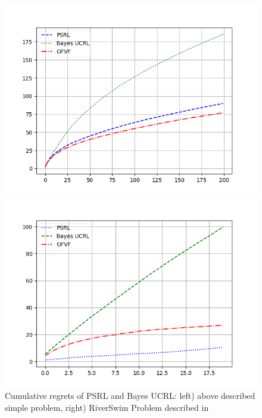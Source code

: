 \documentclass[a4paper,man,natbib]{apa6}
\begin{document}
\begin{figure}
	\centering
	\begin{minipage}[c]{.45\columnwidth}
		\centering
		\includegraphics[width=\linewidth]{figures/SimpleProblem_PSRL_BayesUCRL_OFVF.png}
	\end{minipage}%
	\begin{minipage}[c]{.45\columnwidth}
		\centering
		\includegraphics[width=\linewidth]{figures/RiverSwim_RSVF_BAYESUCB_PSRL.png}
	\end{minipage}%
	\caption{Cumulative regrets of PSRL and Bayes UCRL: left) above described simple problem, right) RiverSwim Problem described in \citep{Osband2013}}
	\label{fig:dirichlet_result}
\end{figure}
\end{document}
